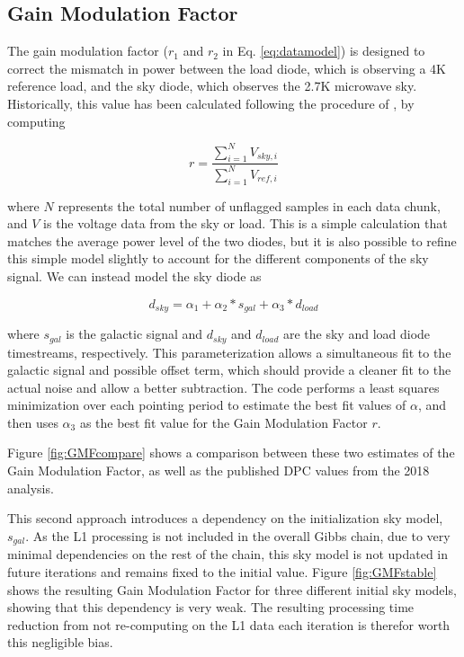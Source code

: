 \documentclass[twocolumn]{aa}
\begin{document}
\subsection{Gain Modulation Factor}
\label{sec:gainFac}

The gain modulation factor ($r_1$ and $r_2$ in Eq. \ref{eq:datamodel}) is designed to correct the mismatch in power between the load diode, which is observing a 4K reference load, and the sky diode, which observes the 2.7K microwave sky. Historically, this value has been calculated following the procedure of  \citet{Mennella_2003}, by computing 

\begin{equation}
r = \frac{\sum^N_{i=1} V_{sky,i}}{\sum^N_{i=1} V_{ref,i}}
\end{equation}

where $N$ represents the total number of unflagged samples in each data chunk, and $V$ is the voltage data from the sky or load. This is a simple calculation that matches the average power level of the two diodes, but it is also possible to refine this simple model slightly to account for the different components of the sky signal. We can instead model the sky diode as 

\begin{equation}
d_{sky} = \alpha_1 + \alpha_2 * s_{gal} + \alpha_3 * d_{load}
\end{equation}

where $s_{gal}$ is the galactic signal and $d_{sky}$ and $d_{load}$ are the sky and load diode timestreams, respectively. This parameterization allows a simultaneous fit to the galactic signal and possible offset term, which should provide a cleaner fit to the actual noise and allow a better subtraction. The code performs a least squares minimization over each pointing period to estimate the best fit values of $\alpha$, and then uses $\alpha_3$ as the best fit value for the Gain Modulation Factor $r$.

Figure \ref{fig:GMFcompare} shows a comparison between these two estimates of the Gain Modulation Factor, as well as the published DPC values from the 2018 analysis. 

This second approach introduces a dependency on the initialization sky model, $s_{gal}$. As the L1 processing is not included in the overall Gibbs chain, due to very minimal dependencies on the rest of the chain, this sky model is not updated in future iterations and remains fixed to the initial value. Figure \ref{fig:GMFstable} shows the resulting Gain Modulation Factor for three different initial sky models, showing that this dependency is very weak. The resulting processing time reduction from not re-computing on the L1 data each iteration is therefor worth this negligible bias.
\end{document}
